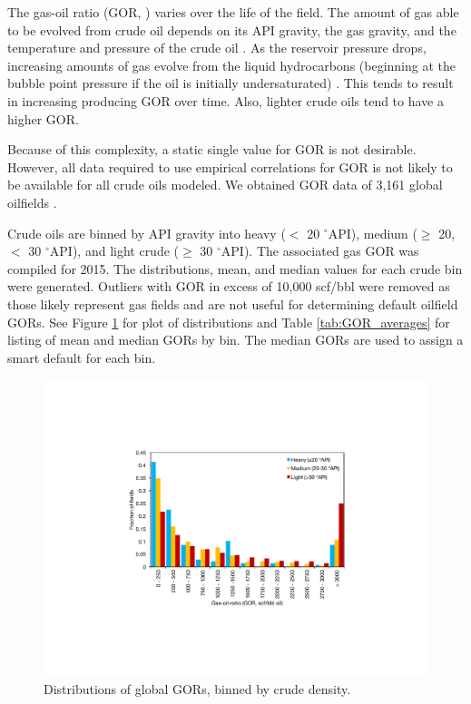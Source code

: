 \documentclass[11pt]{report}
\newcommand{\xlname}[1]{\raisebox{1pt}{\fcolorbox{light-gray}{light-gray}{\texttt{\textcolor{stanford}{\scriptsize{#1}}}}}}
\begin{document}
The gas-oil ratio (GOR, \xlname{GOR}) varies over the life of the field. The amount of gas able to be evolved from crude oil depends on its API gravity, the gas gravity, and the temperature and pressure of the crude oil \cite[p. 297]{Mccain1990}. As the reservoir pressure drops, increasing amounts of gas evolve from the liquid hydrocarbons (beginning at the bubble point pressure if the oil is initially undersaturated) \cite{Mccain1990}. This tends to result in increasing producing GOR over time. Also, lighter crude oils tend to have a higher GOR. 

Because of this complexity, a static single value for GOR is not desirable. However, all data required to use empirical correlations for GOR is not likely to be available for all crude oils modeled. We obtained GOR data of 3,161 global oilfields \cite{Masnadi2018}. 

Crude oils are binned by API gravity into heavy ($<$ 20 $^\circ$API), medium ($\geq$ 20, $<$ 30 $^\circ$API), and light crude ($\geq$ 30 $^\circ$API). The associated gas GOR was compiled for 2015. The distributions, mean, and median values for each crude bin were generated. Outliers with GOR in excess of 10,000 scf/bbl were removed as those likely represent gas fields and are not useful for determining default oilfield GORs. See Figure \ref{fig:API-GOR} for plot of distributions and Table \ref{tab:GOR_averages} for listing of mean and median GORs by bin. The median GORs are used to assign a smart default for each bin. 

\begin{figure}
\includegraphics[width=0.8\columnwidth]{images/API-GOR.pdf}
\caption{Distributions of global GORs, binned by crude density.}
\label{fig:API-GOR}
\end{figure}
\end{document}
